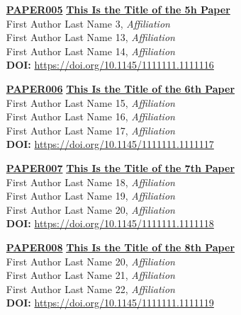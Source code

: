 \begin{enumerate}
\item[\href{https://doi.org/10.1145/1111111.1111116}{\textbf{PAPER005}}]
\href{https://doi.org/10.1145/1111111.1111116}{\textbf{This Is the Title of the 5h Paper}}\\
First Author Last Name 3, \emph{Affiliation}\\
First Author Last Name 13, \emph{Affiliation}\\
First Author Last Name 14, \emph{Affiliation}\\
\textbf{DOI:} \href{https://doi.org/10.1145/1111111.1111116}{https://doi.org/10.1145/1111111.1111116}\\

\item[\href{https://doi.org/10.1145/1111111.1111117}{\textbf{PAPER006}}]
\href{https://doi.org/10.1145/1111111.1111117}{\textbf{This Is the Title of the 6th Paper}}\\
First Author Last Name 15, \emph{Affiliation}\\
First Author Last Name 16, \emph{Affiliation}\\
First Author Last Name 17, \emph{Affiliation}\\
\textbf{DOI:} \href{https://doi.org/10.1145/1111111.1111117}{https://doi.org/10.1145/1111111.1111117}\\

\item[\href{https://doi.org/10.1145/1111111.1111118}{\textbf{PAPER007}}]
\href{https://doi.org/10.1145/1111111.1111118}{\textbf{This Is the Title of the 7th Paper}}\\
First Author Last Name 18, \emph{Affiliation}\\
First Author Last Name 19, \emph{Affiliation}\\
First Author Last Name 20, \emph{Affiliation}\\
\textbf{DOI:} \href{https://doi.org/10.1145/1111111.1111118}{https://doi.org/10.1145/1111111.1111118}\\

\item[\href{https://doi.org/10.1145/1111111.1111119}{\textbf{PAPER008}}]
\href{https://doi.org/10.1145/1111111.1111119}{\textbf{This Is the Title of the 8th Paper}}\\
First Author Last Name 20, \emph{Affiliation}\\
First Author Last Name 21, \emph{Affiliation}\\
First Author Last Name 22, \emph{Affiliation}\\
\textbf{DOI:} \href{https://doi.org/10.1145/1111111.1111119}{https://doi.org/10.1145/1111111.1111119}\\
\end{enumerate}


